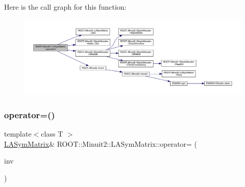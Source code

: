 Here is the call graph for this function\+:
\nopagebreak
\begin{figure}[H]
\begin{center}
\leavevmode
\includegraphics[width=350pt]{d3/d72/classROOT_1_1Minuit2_1_1LASymMatrix_a95fd77b55f726095a231817852fceb7d_cgraph}
\end{center}
\end{figure}
\mbox{\label{classROOT_1_1Minuit2_1_1LASymMatrix_a95fd77b55f726095a231817852fceb7d}} 
\subsubsection{\texorpdfstring{operator=()}{operator=()}\hspace{0.1cm}{\footnotesize\ttfamily [18/21]}}
{\footnotesize\ttfamily template$<$class T $>$ \\
\mbox{\hyperlink{classROOT_1_1Minuit2_1_1LASymMatrix}{L\+A\+Sym\+Matrix}}\& R\+O\+O\+T\+::\+Minuit2\+::\+L\+A\+Sym\+Matrix\+::operator= (\begin{DoxyParamCaption}\item[{const \mbox{\hyperlink{classROOT_1_1Minuit2_1_1ABObj}{A\+B\+Obj}}$<$ \mbox{\hyperlink{classROOT_1_1Minuit2_1_1sym}{sym}}, \mbox{\hyperlink{classROOT_1_1Minuit2_1_1MatrixInverse}{Matrix\+Inverse}}$<$ \mbox{\hyperlink{classROOT_1_1Minuit2_1_1sym}{sym}}, \mbox{\hyperlink{classROOT_1_1Minuit2_1_1ABObj}{A\+B\+Obj}}$<$ \mbox{\hyperlink{classROOT_1_1Minuit2_1_1sym}{sym}}, \mbox{\hyperlink{classROOT_1_1Minuit2_1_1LASymMatrix}{L\+A\+Sym\+Matrix}}, T $>$, T $>$, T $>$ \&}]{inv }\end{DoxyParamCaption})\hspace{0.3cm}{\ttfamily [inline]}}

